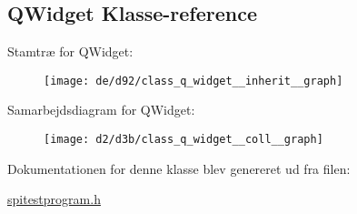 \hypertarget{class_q_widget}{}\subsection{Q\+Widget Klasse-\/reference}
\label{class_q_widget}


Stamtræ for Q\+Widget\+:
\nopagebreak
\begin{figure}[H]
\begin{center}
\leavevmode
\texttt{[image: de/d92/class\_q\_widget\_\_inherit\_\_graph]}
\end{center}
\end{figure}


Samarbejdsdiagram for Q\+Widget\+:
\nopagebreak
\begin{figure}[H]
\begin{center}
\leavevmode
\texttt{[image: d2/d3b/class\_q\_widget\_\_coll\_\_graph]}
\end{center}
\end{figure}


Dokumentationen for denne klasse blev genereret ud fra filen\+:\begin{DoxyCompactItemize}
\item 
\hyperlink{spitestprogram_8h}{spitestprogram.\+h}\end{DoxyCompactItemize}
